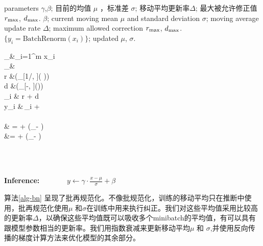 \begin{algorithm}[t]
\begin{algorithmic}
 parameters $\gamma$,$\beta$; 目前的均值 $\mu$ ，标准差 $\sigma$; 移动平均更新率$\Delta$; 最大被允许修正值 $r_{\text{max}}$, $d_{\text{max}}$.
    $\beta$; current moving mean $\mu$ and standard deviation $\sigma$; moving average update rate $\Delta$; maximum allowed correction $r_{\text{max}}$, $d_{\text{max}}$.
  \ENSURE $\{y_i =  \text{BatchRenorm}(x_i)\}$; updated $\mu$, $\sigma$.
  \begin{flalign*}
      \mu_\setB &\leftarrow  {}\sum_{i=1}^m x_i \\
  \sigma_\setB &\leftarrow  {}
\\
  r &\leftarrow {}\left(_{[1/\rmax, \rmax]}\left( \frac{\sigma_\setB}{\sigma}\right)\right) \\
  d &\leftarrow  {}\left(_{[-\dmax, \dmax]}\left(\frac{\mu_\setB-\mu}{\sigma}\right)\right)
  \\
\xhat_i &\leftarrow {} \cdot r + d
\\
  y_i &\leftarrow \gamma\,\xhat_i + \beta   \\
  \\
  \mu & \mathrel{:}= \mu + \Delta (\mu_\setB - \mu) \hspace{0.2in} \\
  \sigma &\mathrel{:}=  \sigma + \Delta (\sigma_\setB - \sigma)
  \end{flalign*}
  \hspace{-.1in}\hrulefill\hspace{.03in}\\
  \vspace{-0.1in}
    \hspace{-.1in}\hrulefill\hspace{.03in}\\
  \vspace{.2in}
  \item[\textbf{Inference:}]\ \ \ \ \ \ \
  $\displaystyle y\leftarrow \gamma\cdot \frac{x-\mu}{\sigma} + \beta$
    \vspace{.1in}
\end{algorithmic}
\end{algorithm}

算法\ref{alg-bn} 呈现了批再规范化。不像批规范化，训练的移动平均只在推断中使用，批再规范化使用$\mu$ 和$\sigma$在训练中用来执行纠正。我们对这些平均值采用比较高的更新率$\Delta$，以确保这些平均值既可以吸收多个minibatch的平均值，有可以具有跟模型参数相当的更新率。我们用指数衰减来更新移动平均$\mu$ 和 $\sigma$,并使用反向传播的梯度计算方法来优化模型的其余部分。

